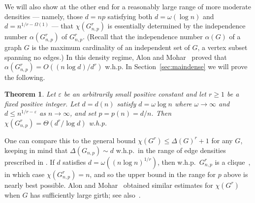 \documentclass[12pt,a4paper]{article}
\def\e{\varepsilon} \def\f{\phi} \def\F{{\Phi}} \def\vp{\varphi} \def\g{\gamma}
\newtheorem{theorem}{Theorem}
\theoremstyle{plain}
\begin{document}
We will also show at the other end for a reasonably large range of more moderate densities --- namely, those $d=np$ satisfying both $d =\omega(\log n)$ and $d = n^{1/r-\Omega(1)}$ --- that  $\chi(G_{n,p}^r)$  is essentially determined by the independence number $\alpha(G_{n,p}^r)$ of $G_{n,p}^r$.  (Recall that the independence number $\alpha(G)$ of a graph $G$ is the maximum cardinality of an independent set of $G$, a vertex subset spanning no edges.) In this density regime, Alon and Mohar~\cite{AlMo02} proved that $\alpha(G_{n,p}^r)=O((n \log d)/d^r)$ w.h.p. In Section~\ref{sec:maindense} we will prove the following.
\begin{theorem}\label{th4}
Let $\e$ be an arbitrarily small positive constant and let $r\geq 1$ be a fixed positive integer. Let $d=d(n)$ satisfy  $d=\omega\log n$ where $\omega\to\infty$ and $d\leq n^{1/r-\e}$ as $n\to\infty$, and set $p=p(n)=d/n$. Then $\chi(G_{n,p}^r) = \Theta(d^r/\log d)$ w.h.p.
\end{theorem}
\noindent
One can compare this to the general bound $\chi(G^r) \le \Delta(G)^r+1$ for any $G$, keeping in mind that $\Delta(G_{n,p}) \sim d$ w.h.p.~in the range of edge densities prescribed in .  
If $d$ satisfies $d = \omega((n \log n)^{1/r})$, then w.h.p.~$G_{n,p}^r$ is a clique~\cite{KlLa81}, in which case $\chi(G_{n,p}^r)=n$, and so the upper bound in the range for $p$ above is nearly best possible.
Alon and Mohar~\cite{AlMo02} obtained similar estimates for $\chi(G^r)$ when $G$ has sufficiently large girth; see also~\cite{KaPi16,KaPi18,KaLo19}.
\end{document}
